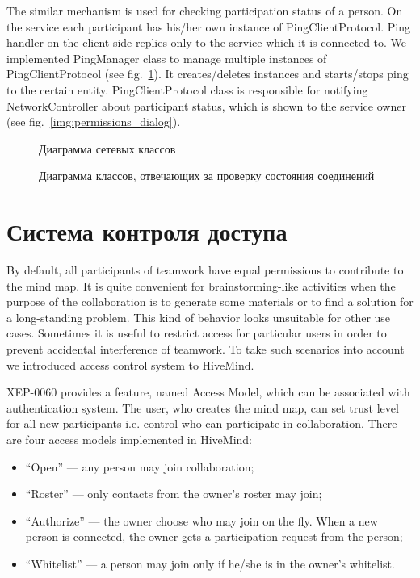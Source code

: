 The similar mechanism is used for checking participation status of a person. On
the service each participant has his/her own instance of PingClientProtocol. Ping
handler on the client side replies only to the service which it is connected
to. We implemented PingManager class to manage multiple instances of
PingClientProtocol (see fig.~\ref{img:ping_manager}).  It creates/deletes instances
and starts/stops ping to the certain entity. PingClientProtocol class is
responsible for notifying NetworkController about participant status, which is
shown to the service owner (see fig.~\ref{img:permissions_dialog}).

\begin{figure}
\begin{minipage}[t]{0.64\linewidth}
  \caption{Диаграмма сетевых классов}
  \label{img:network_classes}
\end{minipage}
\hfill
\begin{minipage}[t]{0.35\linewidth}
  \caption{Диаграмма классов, отвечающих за проверку состояния соединений}
  \label{img:ping_manager}
\end{minipage}
\end{figure}


\section{Система контроля доступа}

By default, all participants of teamwork have equal permissions to contribute to
the mind map. It is quite convenient for brainstorming-like activities when the
purpose of the collaboration is to generate some materials or to find a solution
for a long-standing problem. This kind of behavior looks unsuitable for other
use cases. Sometimes it is useful to restrict access for particular users in
order to prevent accidental interference of teamwork. To take such scenarios
into account we introduced access control system to HiveMind.

XEP-0060 provides a feature, named Access Model, which can be associated with
authentication system. The user, who creates the mind map, can set trust level
for all new participants i.e. control who can participate in collaboration.
There are four access models implemented in HiveMind:
\begin{itemize}
\item ``Open'' --- any person may join collaboration;
\item ``Roster'' --- only contacts from the owner’s roster may join;
\item ``Authorize'' --- the owner choose who may join on the fly. When a new
  person is connected, the owner gets a participation request from the person;
\item ``Whitelist'' --- a person may join only if he/she is in the owner’s
  whitelist.
\end{itemize}

